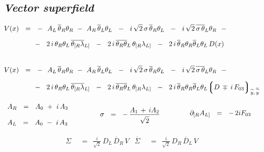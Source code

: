 \documentclass[14pt]{article}
\newcommand{\p}{\partial}
\newcommand{\wt}{\widetilde}
\newcommand{\ov}{\overline}
\newcommand{\lgr}{\left\lgroup}
\newcommand{\rgr}{\right\rgroup}
\begin{document}
\subsection*{\centering \it Vector superfield}
\begin{align*}
	V(x) & ~~=~~ -~~ A_L\, \ov\theta{}_R\theta_R  ~-~ A_R\, \ov\theta{}_L\theta_L  
                   ~~-~~ i\, \sqrt{2}\,\sigma\, \ov\theta{}_R\theta_L  
                   ~~-~~ i\, \sqrt{2}\, \ov{\sigma\, \theta}{}_L\theta_R
                   ~~-
	\\[2mm]
	& \phantom{~~=~~}
	             -~~ 2\,i\, \theta_R\theta_L\,\ov{\theta_{[R} \lambda}{}_{L]}  
                   ~~-~~  2\,i\, \ov{\theta_R\theta}{}_L\, \theta_{[R}\lambda_{L]}
	           ~~-~~ 2\,i\, \ov\theta{}_R\theta_R \ov\theta{}_L\theta_L\, D(x)
	\\ \\[2mm]
	V(x) & ~~=~~ -~~ A_L\, \ov\theta{}_R\theta_R  ~-~ A_R\, \ov\theta{}_L\theta_L  
                   ~~-~~ i\, \sqrt{2}\,\sigma\, \ov\theta{}_R\theta_L  
                   ~~-~~ i\, \sqrt{2}\, \ov{\sigma\, \theta}{}_L\theta_R
                   ~~-
	\\[2mm]
	& \phantom{~~=~~}
	             -~~ 2\,i\, \theta_R\theta_L\,\ov{\theta_{[R} \lambda}{}_{L]}  
                   ~~-~~  2\,i\, \ov{\theta_R\theta}{}_L\, \theta_{[R}\lambda_{L]}
	           ~~-~~ 2\,i\, \ov\theta{}_R\theta_R \ov\theta{}_L\theta_L\, \!\! \lgr D \,\mp\, i\, F_{03} \rgr_{\wt y,\, {\ov{\wt y}}}
\end{align*}

\begin{equation*}
\begin{array}{lll}
	A_R       ~~=~~    A_0  ~+~  i\,A_3
	&
	\qquad\quad
	\raisebox{-1.5ex}{
		\multirow{2}{*}{
		$ \sigma    ~~=~~    -\, \frac{\raisebox{0.5ex}{$\displaystyle A_1 \,+\, i A_2$}}
							{\raisebox{-1.4ex}{$ \displaystyle \sqrt 2$}} $
		}
	}
	&
	\qquad
	\raisebox{-0.8ex}{
		\multirow{2}{*}{
	 	   $ \p_{[R} A_{L]}    ~~=~~    -\, 2i F_{03} $
		}
	}
	\\[4mm]
	A_L       ~~=~~    A_0  ~-~  i\,A_3
\end{array}
\end{equation*}

\begin{align*}
	\Sigma    & ~~=~~    \frac{i}{\sqrt 2}\, D_L\, \ov D{}_R\, V
	&
	\ov \Sigma    & ~~=~~    \frac{i}{\sqrt 2}\, D_R\, \ov D{}_L\, V
\end{align*}
\end{document}
